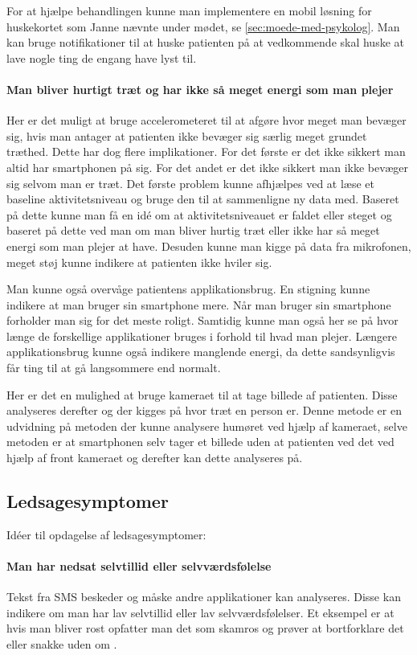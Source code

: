 For at hjælpe behandlingen kunne man implementere en mobil løsning for huskekortet som Janne nævnte under mødet, se \cref{sec:moede-med-psykolog}. Man kan bruge notifikationer til at huske patienten på at vedkommende skal huske at lave nogle ting de engang have lyst til.

\paragraph{Man bliver hurtigt træt og har ikke så meget energi som man plejer}
Her er det muligt at bruge accelerometeret til at afgøre hvor meget man bevæger sig, hvis man antager at patienten ikke bevæger sig særlig meget grundet træthed. Dette har dog flere implikationer. For det første er det ikke sikkert man altid har smartphonen på sig. For det andet er det ikke sikkert man ikke bevæger sig selvom man er træt.
Det første problem kunne afhjælpes ved at læse et baseline aktivitetsniveau og bruge den til at sammenligne ny data med. Baseret på dette kunne man få en idé om at aktivitetsniveauet er faldet eller steget og baseret på dette ved man om man bliver hurtig træt eller ikke har så meget energi som man plejer at have. 
Desuden kunne man kigge på data fra mikrofonen, meget støj kunne indikere at patienten ikke hviler sig.

Man kunne også overvåge patientens applikationsbrug. 
En stigning kunne indikere at man bruger sin smartphone mere. 
Når man bruger sin smartphone forholder man sig for det meste roligt.
Samtidig kunne man også her se på hvor længe de forskellige applikationer bruges i forhold til hvad man plejer.
Længere applikationsbrug kunne også indikere manglende energi, da dette sandsynligvis får ting til at gå langsommere end normalt.

Her er det en mulighed at bruge kameraet til at tage billede af patienten. Disse analyseres derefter og der kigges på hvor træt en person er. 
Denne metode er en udvidning på metoden der kunne analysere humøret ved hjælp af kameraet, selve metoden er at smartphonen selv tager et billede uden at patienten ved det ved hjælp af front kameraet og derefter kan dette analyseres på.

\subsection{Ledsagesymptomer}\label{depr_ledsage}
Idéer til opdagelse af ledsagesymptomer:
\paragraph{Man har nedsat selvtillid eller selvværdsfølelse}
Tekst fra SMS beskeder og måske andre applikationer kan analyseres. Disse kan indikere om man har lav selvtillid eller lav selvværdsfølelser. Et eksempel er at hvis man bliver rost opfatter man det som skamros og prøver at bortforklare det eller snakke uden om \citep{selvtillid}.

